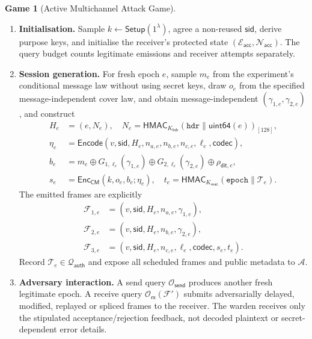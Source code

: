 \documentclass[pdflatex,sn-mathphys-num]{sn-jnl}%
\theoremstyle{definition}
\theoremstyle{game}
\newtheorem{game}{Game}[section]
\theoremstyle{thmstyleone}%
\theoremstyle{thmstyletwo}%
\theoremstyle{thmstylethree}%
\begin{document}
\begin{game}[Active Multichannel Attack Game]\label{game1}
\begin{enumerate}[label=\Alph*.,leftmargin=2.2em]
\item \textbf{Initialisation.}
Sample $k\leftarrow\mathsf{Setup}(1^\lambda)$, agree a non-reused
$\mathsf{sid}$, derive purpose keys, and initialise the receiver's protected
state $(\mathcal E_{\mathsf{acc}},\mathcal N_{\mathsf{acc}})$.
The query budget counts legitimate emissions and receiver attempts separately.

\item \textbf{Session generation.}
For fresh epoch $e$, sample $m_e$ from the experiment's conditional message
law without using secret keys, draw $o_e$ from the specified message-independent
cover law, and obtain message-independent $(\gamma_{1,e},\gamma_{2,e})$, and construct
\[
\begin{aligned}
H_e&=(e,N_e),\quad
N_e=\mathsf{HMAC}_{K_{\mathsf{hdr}}}(\texttt{hdr}\parallel\mathsf{uint64}(e))_{[128]},\\
\eta_e&=\mathsf{Encode}(v,\mathsf{sid},H_e,n_{a,e},n_{b,e},n_{c,e},\ell_e,\mathsf{codec}),\\
b_e&=m_e\oplus G_{1,\ell_e}(\gamma_{1,e})\oplus G_{2,\ell_e}(\gamma_{2,e})
\oplus\rho_{\mathsf{dit},e},\\
s_e&=\mathsf{Enc}_{\mathsf{CM}}(k,o_e,b_e;\eta_e),\quad
 t_e=\mathsf{HMAC}_{K_{\mathsf{mac}}}(\texttt{epoch}\parallel\mathcal T_e).
\end{aligned}
\]
The emitted frames are explicitly
\begin{equation}\label{complete_protocol_frame}
\begin{aligned}
\mathcal F_{1,e}&=(v,\mathsf{sid},H_e,n_{a,e},\gamma_{1,e}),\\
\mathcal F_{2,e}&=(v,\mathsf{sid},H_e,n_{b,e},\gamma_{2,e}),\\
\mathcal F_{3,e}&=(v,\mathsf{sid},H_e,n_{c,e},\ell_e,\mathsf{codec},s_e,t_e).
\end{aligned}
\end{equation}
Record $\mathcal T_e\in\mathcal Q_{\mathsf{auth}}$ and expose all scheduled
frames and public metadata to $\mathcal A$.

\item \textbf{Adversary interaction.}
A send query $\mathcal O_{\mathsf{send}}$ produces another fresh legitimate
epoch. A receive query $\mathcal O_{\mathsf{rx}}(\mathcal F')$ submits
adversarially delayed, modified, replayed or spliced frames to the receiver.
The warden receives only the stipulated acceptance/rejection feedback,
not decoded plaintext or secret-dependent error details.


\end{enumerate}
\end{game}
\end{document}
